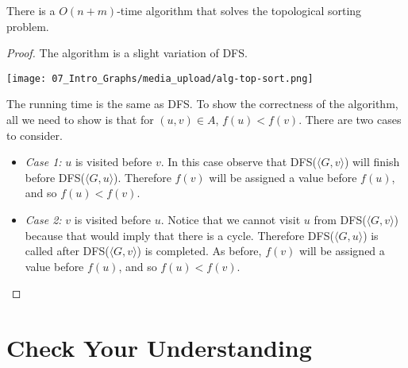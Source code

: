 \begin{flex}
\label{grp:thm:intro-to-graph-theory::topological-sort-via-dfs}

\begin{theorem}
\label{thm:intro-to-graph-theory::topological-sort-via-dfs}
There is a $O(n+m)$-time algorithm that solves the topological sorting problem.

\end{theorem}

\begin{proof}
\label{prf:intro-to-graph-theory::slight}
The algorithm is a slight variation of DFS.

\begin{center}
    \texttt{[image: 07\_Intro\_Graphs/media\_upload/alg-top-sort.png]}
\end{center}

The running time is the same as DFS. To show the correctness of the algorithm, all we need to show is that for $(u,v) \in A$, $f(u) < f(v)$. There are two cases to consider.
\begin{itemize}
    \item \emph{Case 1:} $u$ is visited before $v$. In this case observe that DFS($\langle G, v\rangle$) will finish before DFS($\langle G, u\rangle$). Therefore $f(v)$ will be assigned a value before $f(u)$, and so $f(u) < f(v)$. 
    \item \emph{Case 2:} $v$ is visited before $u$. Notice that we cannot visit $u$ from DFS($\langle G, v\rangle$) because that would imply that there is a cycle. Therefore DFS($\langle G, u\rangle$) is called after DFS($\langle G, v\rangle$) is completed. As before, $f(v)$ will be assigned a value before $f(u)$, and so $f(u) < f(v)$. 
\end{itemize}

\end{proof}
\end{flex}


\section{Check Your Understanding}
\label{sec:intro-to-graph-theory::check-your-understanding}

